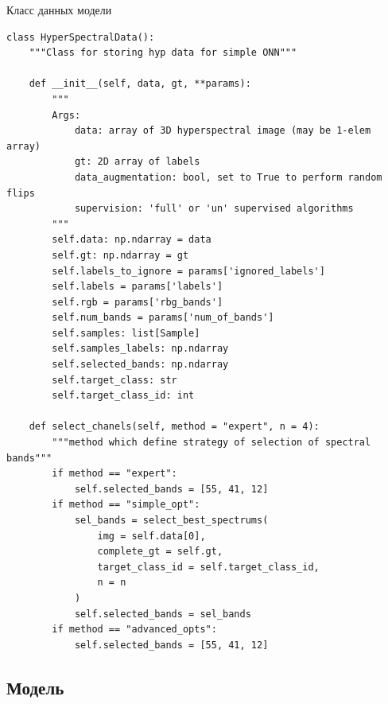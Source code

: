 \documentclass[14pt, russian]{scrartcl}
\begin{document}
\begin{listing}[!htt]
    \caption{Класс данных модели}
    \label{lst:hyp_data}
    \begin{verbatim}
class HyperSpectralData():
    """Class for storing hyp data for simple ONN"""

    def __init__(self, data, gt, **params):
        """
        Args:
            data: array of 3D hyperspectral image (may be 1-elem array)
            gt: 2D array of labels
            data_augmentation: bool, set to True to perform random flips
            supervision: 'full' or 'un' supervised algorithms
        """
        self.data: np.ndarray = data
        self.gt: np.ndarray = gt
        self.labels_to_ignore = params['ignored_labels']
        self.labels = params['labels']
        self.rgb = params['rbg_bands']
        self.num_bands = params['num_of_bands']
        self.samples: list[Sample]
        self.samples_labels: np.ndarray
        self.selected_bands: np.ndarray
        self.target_class: str
        self.target_class_id: int

    def select_chanels(self, method = "expert", n = 4):
        """method which define strategy of selection of spectral bands"""
        if method == "expert":
            self.selected_bands = [55, 41, 12]
        if method == "simple_opt":
            sel_bands = select_best_spectrums(
                img = self.data[0],
                complete_gt = self.gt,
                target_class_id = self.target_class_id,
                n = n
            )
            self.selected_bands = sel_bands
        if method == "advanced_opts":
            self.selected_bands = [55, 41, 12]
    \end{verbatim}
\end{listing}

\subsection{Модель}
\end{document}
